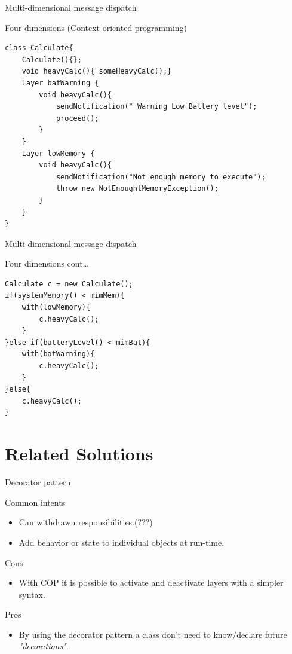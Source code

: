 \documentclass[presentation]{beamer}
\begin{document}
\begin{frame}[fragile,label={sec:orgc7dcc58}]{Multi-dimensional message dispatch}
 \begin{block}{Four dimensions (Context-oriented programming)}
\begin{verbatim}
class Calculate{
    Calculate(){};
    void heavyCalc(){ someHeavyCalc();}
    Layer batWarning {
        void heavyCalc(){
            sendNotification(" Warning Low Battery level");
            proceed();
        }
    }
    Layer lowMemory {
        void heavyCalc(){
            sendNotification("Not enough memory to execute");
            throw new NotEnoughtMemoryException();
        }
    }
}
\end{verbatim}
\end{block}
\end{frame}


\begin{frame}[fragile,label={sec:org7496f79}]{Multi-dimensional message dispatch}
 \begin{block}{Four dimensions  cont\ldots{}}
\begin{verbatim}
Calculate c = new Calculate();
if(systemMemory() < mimMem){
    with(lowMemory){
        c.heavyCalc();
    }
}else if(batteryLevel() < mimBat){
    with(batWarning){
        c.heavyCalc();
    }
}else{
    c.heavyCalc();
}
\end{verbatim}
\end{block}
\end{frame}

\section{Related Solutions}
\label{sec:orge928c76}

\begin{frame}[label={sec:org55587d9}]{Decorator pattern}
\begin{block}{Common intents}
\begin{itemize}
\item Can withdrawn responsibilities.(???)
\item Add behavior or state to individual objects at run-time.
\end{itemize}
\end{block}

\begin{block}{Cons}
\begin{itemize}
\item With COP it is possible to activate and deactivate layers with a simpler syntax.
\end{itemize}
\end{block}

\begin{block}{Pros}
\begin{itemize}
\item By using the decorator pattern a class don't need to know/declare future \emph{"decorations"}.
\end{itemize}
\end{block}
\end{frame}
\end{document}
